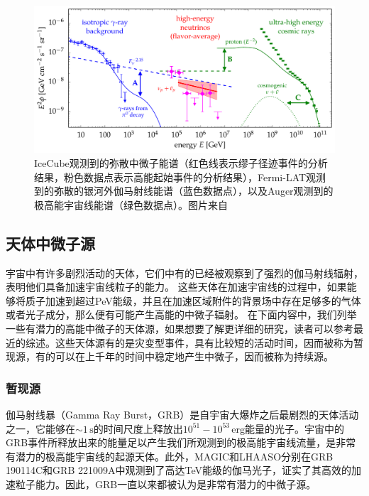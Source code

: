 \begin{figure}[htb]
    \centering
    \includegraphics[width=0.8\linewidth]{img/diffuse_neutrino_CR_gamma.pdf}
    \caption{IceCube观测到的弥散中微子能谱（红色线表示缪子径迹事件的分析结果\cite{IceCube_diffse_muon:2017}，粉色数据点表示高能起始事件的分析结果\cite{IceCube_6yr_cascade_spectrum:2017}），Fermi-LAT观测到的弥散的银河外伽马射线能谱（蓝色数据点）\cite{Fermi_diffuse_gamma:2014}，以及Auger观测到的极高能宇宙线能谱（绿色数据点）\cite{Auger_diffuse:2015}。图片来自\cite{Astro2020_neutrino}}
    \label{fig:diffuse_neutrino_CR_gamma}
\end{figure}


\subsection{天体中微子源}

宇宙中有许多剧烈活动的天体，它们中有的已经被观察到了强烈的伽马射线辐射，表明他们具备加速宇宙线粒子的能力。
这些天体在加速宇宙线的过程中，如果能够将质子加速到超过PeV能级，并且在加速区域附件的背景场中存在足够多的气体或者光子成分，那么便有可能产生高能的中微子辐射。
在下面内容中，我们列举一些有潜力的高能中微子的天体源，如果想要了解更详细的研究，读者可以参考最近的综述\cite{Kurahashi_review_nu_mm:2022}。这些天体源有的是灾变型事件，具有比较短的活动时间，因而被称为暂现源，有的可以在上千年的时间中稳定地产生中微子，因而被称为持续源。

\subsubsection{暂现源}

伽马射线暴（Gamma Ray Burst，GRB）是自宇宙大爆炸之后最剧烈的天体活动之一，它能够在$\sim 1\,\mathrm{s}$的时间尺度上释放出$10^{51}-10^{53}\,\mathrm{erg}$能量的光子\cite{zhang:2018}。宇宙中的GRB事件所释放出来的能量足以产生我们所观测到的极高能宇宙线流量，是非常有潜力的极高能宇宙线的起源天体\cite{Waxman:1995}。此外，MAGIC和LHAASO分别在GRB 190114C和GRB 221009A中观测到了高达TeV能级的伽马光子\cite{MAGIC_GRB190114C:2019}，证实了其高效的加速粒子能力。因此，GRB一直以来都被认为是非常有潜力的中微子源\cite{Waxman:1997ti}。

